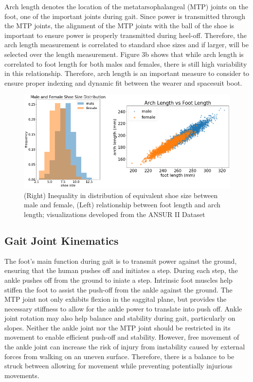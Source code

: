 \documentclass[defaultstyle,11pt]{comps}
\begin{document}
Arch length denotes the location of the metatarsophalangeal (MTP) joints on the foot, one of the important joints during gait.
Since power is transmitted through the MTP joints, the alignment of the MTP joints with the ball of the shoe is important to ensure power is properly transmitted during heel-off.
Therefore, the arch length measurement is correlated to standard shoe sizes and if larger, will be selected over the length measurement.
Figure 3b shows that while arch length is correlated to foot length for both males and females, there is still high variability in this relationship.
Therefore, arch length is an important measure to consider to ensure proper indexing and dynamic fit between the wearer and spacesuit boot.

\begin{figure}
\hypertarget{fig:SA3-ANSUR}{%
\centering
\includegraphics{../fig/SA3/ANSUR.png}
\caption{(Right) Inequality in distribution of equivalent shoe size between male and female, (Left) relationship between foot length and arch length; visualizations developed from the ANSUR II Dataset}\label{fig:SA3-ANSUR}
}
\end{figure}

\hypertarget{gait-joint-kinematics}{%
\subsection{Gait Joint Kinematics}\label{gait-joint-kinematics}}

The foot's main function during gait is to transmit power against the ground, ensuring that the human pushes off and initiates a step.
During each step, the ankle pushes off from the ground to iniate a step.
Intrinsic foot muscles help stiffen the foot to assist the push-off from the ankle against the ground\citep{Farris2019}.
The MTP joint not only exhibits flexion in the saggital plane, but provides the necessary stiffness to allow for the ankle power to translate into push off\citep{Stefanyshyn1997}.
Ankle joint rotation may also help balance and stability during gait, particularly on slopes\citep{Wannop2014}. Neither the ankle joint nor the MTP joint should be restricted in its movement to enable efficient push-off and stability.
However, free movement of the ankle joint can increase the risk of injury from instability caused by external forces from walking on an uneven surface.
Therefore, there is a balance to be struck between allowing for movement while preventing potentially injurious movements.
\end{document}
